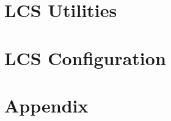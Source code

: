\documentclass[a4paper, 11pt]{book}
\begin{document}
 	

    
    
    
    
    
 	\part{LCS Utilities}
 	
 	
    
    
	
    
    \part{LCS Configuration}
    
    
    
         
    
    
    \part{Appendix}   
    
    \appendix 

    

    
    
    
    \backmatter             
\end{document}
